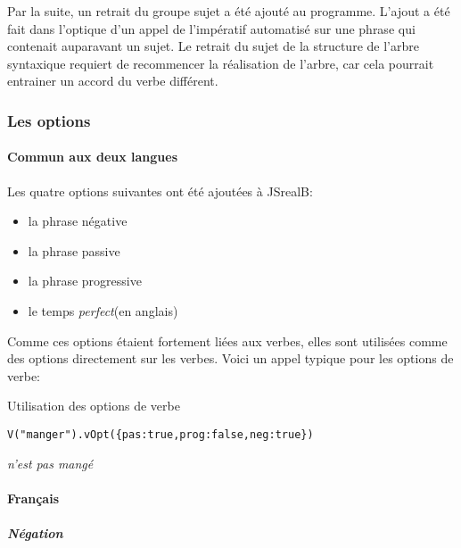 \documentclass[11pt]{article} %
\newcommand{\system}[1]{\textsf{#1}}
\newcommand{\JSB}{\system{JSrealB}}
\newcommand{\real}[1]{\emph{#1}}
\begin{document}
Par la suite, un retrait du groupe sujet a été ajouté au programme.
L'ajout a été fait dans l'optique d'un appel de l'impératif automatisé
sur une phrase qui contenait auparavant un sujet. Le retrait du sujet
de la structure de l'arbre syntaxique requiert de recommencer la réalisation
de l'arbre, car cela pourrait entrainer un accord du verbe différent.

\subsubsection{Les options}
\label{subsec:vOptions}
\paragraph{Commun aux deux langues}
Les quatre options suivantes ont été ajoutées à \JSB{}:
\begin{itemize}
\item la phrase négative
\item la phrase passive
\item la phrase progressive
\item le temps \emph{perfect}(en anglais)
\end{itemize} 
Comme ces options étaient fortement liées aux verbes, elles sont utilisées
comme des options directement sur les verbes. Voici un appel typique pour les options de verbe: 
\begin{example}
\caption{Utilisation des options de verbe}
\begin{alltt}
{V("manger").vOpt(\{pas:true,prog:false,neg:true\})}
\end{alltt}
\real{n'est pas mangé}
\end{example}

\paragraph{Français}

\subparagraph{Négation}
\end{document}
